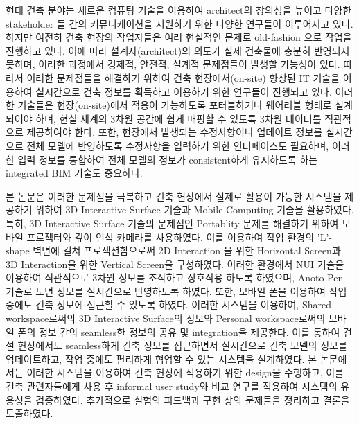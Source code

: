 

현대 건축 분야는 새로운 컴퓨팅 기술을 이용하여 architect의 창의성을 높이고 다양한 stakeholder 들 간의 커뮤니케이션을 지원하기 위한 다양한 연구들이 이루어지고 있다. 하지만 여전히 건축 현장의 작업자들은 여러 현실적인 문제로 old-fashion 으로 작업을 진행하고 있다\cite{behzadan_visualization_2005}. 이에 따라 설계자(architect)의 의도가 실제 건축물에 충분히 반영되지 못하며, 이러한 과정에서 경제적, 안전적, 설계적 문제점들이 발생할 가능성이 있다. 따라서 이러한 문제점들을 해결하기 위하여 건축 현장에서(on-site) 향상된 IT 기술을 이용하여 실시간으로 건축 정보를 획득하고 이용하기 위한 연구들이 진행되고 있다. 이러한 기술들은 현장(on-site)에서 적용이 가능하도록 포터블하거나 웨어러블 형태로 설계되어야 하며\cite{song_penlight:_2009, yeh_-site_2012}, 현실 세계의 3차원 공간에 쉽게 매핑할 수 있도록 3차원 데이터를 직관적으로 제공하여야 한다\cite{chi_research_2013, kim_interactive_2012, yeh_-site_2012}. 또한, 현장에서 발생되는 수정사항이나 업데이트 정보를 실시간으로 전체 모델에 반영하도록 수정사항을 입력하기 위한 인터페이스도 필요하며\cite{song_penlight:_2009}, 이러한 입력 정보를 통합하여 전체 모델의 정보가 consistent하게 유지하도록 하는 integrated BIM 기술도 중요하다.

본 논문은 이러한 문제점을 극복하고 건축 현장에서 실제로 활용이 가능한 시스템을 제공하기 위하여 3D Interactive Surface 기술\cite{grossman__2010}과 Mobile Computing 기술을 활용하였다. 특히, 3D Interactive Surface 기술의 문제점인 Portablity 문제를 해결하기 위하여 모바일 프로젝터와 깊이 인식 카메라를 사용하였다. 이를 이용하여 작업 환경의 'L'-shape 벽면에 걸쳐 프로젝션함으로써 2D Interaction 을 위한 Horizontal Screen과 3D Interaction을 위한 Vertical Screen을 구성하였다. 이러한 환경에서 NUI 기술을 이용하여 직관적으로 3차원 정보를 조작하고 상호작용 하도록 하였으며, Anoto Pen 기술로 도면 정보를 실시간으로 반영하도록 하였다. 또한, 모바일 폰을 이용하여 작업 중에도 건축 정보에 접근할 수 있도록 하였다. 이러한 시스템을 이용하여, Shared workspace로써의 3D Interactive Surface의 정보와 Personal workspace로써의 모바일 폰의 정보 간의 seamless한 정보의 공유 및 integration을 제공한다. 이를 통하여 건설 현장에서도 seamless하게 건축 정보를 접근하면서 실시간으로 건축 모델의 정보를 업데이트하고, 작업 중에도 편리하게 협업할 수 있는 시스템을 설계하였다. 본 논문에서는 이러한 시스템을 이용하여 건축 현장에 적용하기 위한 design을 수행하고, 이를 건축 관련자들에게 사용 후 informal user study와 비교 연구를 적용하여 시스템의 유용성을 검증하였다. 추가적으로 실험의 피드백과 구현 상의 문제들을 정리하고 결론을 도출하였다.